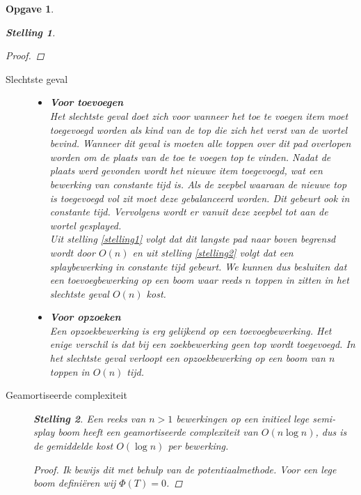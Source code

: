 \documentclass[12pt,hidelinks]{article}
\newtheorem{opgave}{Opgave}
\newtheorem{stelling}{Stelling}
\begin{document}
\begin{opgave}
\begin{stelling}
\begin{proof}
            \end{proof}
        \end{stelling}
        \begin{description}
            \item[Slechtste geval]
                \hfill
                \begin{itemize}
                    \item \textbf{Voor toevoegen}\\
                        Het slechtste geval doet zich voor wanneer het toe te voegen item moet toegevoegd worden als kind van de top die zich het verst van de wortel bevind. 
                        Wanneer dit geval is moeten alle toppen over dit pad overlopen worden om de plaats van de toe te voegen top te vinden.
                        Nadat de plaats werd gevonden wordt het nieuwe item toegevoegd, wat een bewerking van constante tijd is.
                        Als de zeepbel waaraan de nieuwe top is toegevoegd vol zit moet deze gebalanceerd worden. Dit gebeurt ook in constante tijd.
                        Vervolgens wordt er vanuit deze zeepbel tot aan de wortel gesplayed.
                        \\
                        Uit stelling \ref{stelling1} volgt dat dit langste pad naar boven begrensd wordt door $O(n)$ en uit stelling \ref{stelling2} volgt dat een splaybewerking in constante tijd gebeurt.
                        We kunnen dus besluiten dat een toevoegbewerking op een boom waar reeds $n$ toppen in zitten in het slechtste geval $O(n)$ kost.
                    \item \textbf{Voor opzoeken}\\
                        Een opzoekbewerking is erg gelijkend op een toevoegbewerking. 
                        Het enige verschil is dat bij een zoekbewerking geen top wordt toegevoegd.
                        In het slechtste geval verloopt een opzoekbewerking op een boom van $n$ toppen in $O(n)$ tijd.
                \end{itemize}
            \item[Geamortiseerde complexiteit]
                \hfill
                \begin{stelling}
                    Een reeks van $n > 1$ bewerkingen op een initieel lege semi-splay boom heeft een geamortiseerde complexiteit van $O(n \log n)$, dus is de gemiddelde kost $O(\log n)$ per bewerking.
                    \begin{proof}
                        Ik bewijs dit met behulp van de potentiaalmethode. Voor een lege boom definiëren wij $\Phi(T)=0$.

\end{proof}
\end{stelling}
\end{description}
\end{opgave}
\end{document}
